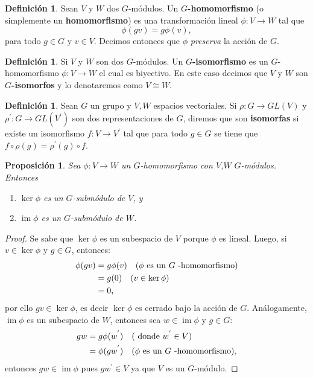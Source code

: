 \documentclass[12pt]{book}
\newtheorem{proposition}[theorem]{Proposición}
\theoremstyle{definition}
\newtheorem{definition}[theorem]{Definición}
\newcounter{in}
\newcounter{ini}
\DeclareMathOperator{\im}{im}
\begin{document}
\begin{mdframed}
\begin{definition}
  Sean $V$ y $W$ dos $G$-módulos. Un $G$\textbf{-homomorfismo} (o simplemente
  un \textbf{homomorfismo}) es una transformación lineal $\phi:V\rightarrow
  W$ tal que
  \begin{equation*}
    \phi(gv)=g\phi(v),
  \end{equation*}
para todo $g\in G$ y $v\in V$. Decimos entonces que $\phi$ \emph{preserva} la acción
de $G$.
\end{definition}

\begin{definition}
  Si $V$ y $W$ son dos $G$-módulos. Un $G$\textbf{-isomorfismo} es un
  $G$-homomorfismo $\phi:V\rightarrow W$ el cual es biyectivo. En
  este caso decimos que $V$ y $W$ son $G$\textbf{-isomorfos} y lo
  denotaremos como $V\cong W$.
\end{definition}

\begin{definition}
  Sean $G$ un grupo y $V,W$ espacios vectoriales. Si $\rho:G\rightarrow GL(V)$ y
  $\rho^{'}:G\rightarrow GL(V^{'})$ son dos representaciones de $G$,
  diremos que son \textbf{isomorfas} si existe un isomorfismo
  $f:V\rightarrow V^{'}$ tal que para todo $g\in G$ se tiene que
  $f\circ\rho(g)=\rho^{'}(g)\circ f$. 
\end{definition}

\begin{proposition}
  \label{ker-im-sub}
  Sea $\phi:V\rightarrow W$ un $G$-homomorfismo con $V$,$W$ $G$-módulos. Entonces
  \begin{enumerate}
  \item $\ker\phi$ es un $G$-submódulo de $V$, y
  \item $\im\phi$ es un $G$-submódulo de $W$.
  \end{enumerate}  
\end{proposition}  
\begin{proof}
Se sabe que $\ker\phi$ es un subespacio de $V$ porque $\phi$ es lineal. Luego, si $v \in \ker \phi$ y $g \in G$, entonces:
\begin{equation}
\begin{aligned}
\phi (gv) & = g \phi (v) \quad (\phi \textup{ es un } G \textup{ -homomorfismo})\\
& = g(0) \quad (v \in \ker \phi) \\
& = 0,
\end{aligned}
\end{equation}
por ello $gv \in \ker \phi$, es decir $\ker \phi$ es cerrado bajo la acción de $G$.
Análogamente, $\im \phi$ es un subespacio de $W$, entonces sea $w \in \im \phi$ y $g \in G$:
\begin{equation}
\begin{aligned}
gw & = g \phi(w^{'}) \quad (\textup{ donde } w^{'} \in V)\\
& = \phi(gw^{'}) \quad (\phi \textup{ es un } G \textup{ -homomorfismo}),
\end{aligned}
\end{equation}
entonces $gw \in \im \phi$ pues $gw^{'} \in V$ ya que $V$ es un $G$-módulo.
\end{proof}


\end{mdframed}
\end{document}
